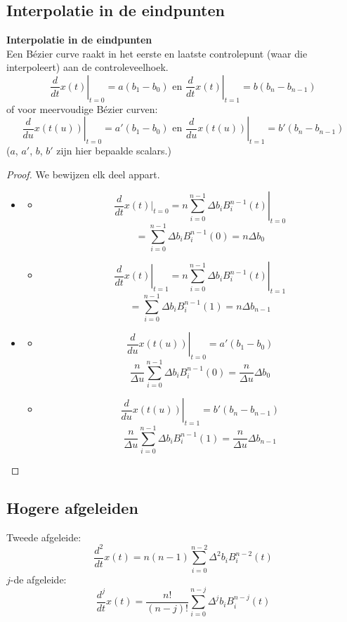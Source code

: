 \documentclass[computergesteund_ontwerp_van_curven_en_oppervlakken.tex]{subfiles}
\begin{document}
\subsection{Interpolatie in de eindpunten}
\begin{ei}\textbf{Interpolatie in de eindpunten}\\
Een B\'ezier curve raakt in het eerste en laatste controlepunt (waar die interpoleert) aan de controleveelhoek.
\[
\left.\frac{d}{dt} x(t)\right|_{t=0} = a(b_1-b_{0})
\text{ en }
\left.\frac{d}{dt}x(t)\right|_{t=1} = b(b_n-b_{n-1})
\]
\[
\]
of voor meervoudige B\'ezier curven:
\[
\left.\frac{d}{du}x(t(u))\right|_{t=0} = a'(b_1-b_{0})
\text{ en }
\left.\frac{d}{du}x(t(u))\right|_{t=1} = b'(b_n-b_{n-1})
\]
($a$, $a'$, $b$, $b'$ zijn hier bepaalde scalars.) 

\begin{proof}
We bewijzen elk deel appart.
\begin{itemize}
\item
\begin{itemize}
\item
\[
\frac{d}{dt}x(t)|_{t=0}
= \left.n\sum_{i=0}^{n-1}\Delta b_iB_{i}^{n-1}(t)\right|_{t=0}
\]
\[
= \sum_{i=0}^{n-1}\Delta b_iB_{i}^{n-1}(0)
= n\Delta b_0
\]
\item
\[
\left.\frac{d}{dt}x(t)\right|_{t=1}
= \left.n\sum_{i=0}^{n-1}\Delta b_iB_{i}^{n-1}(t)\right|_{t=1}
\]
\[
= \sum_{i=0}^{n-1}\Delta b_iB_{i}^{n-1}(1)
= n\Delta b_{n-1}
\]
\end{itemize}
\item
\begin{itemize}
\item
\[
\left.\frac{d}{du}x(t(u))\right|_{t=0} = a'(b_1-b_{0})
\]
\[
\frac{n}{\Delta u}\sum_{i=0}^{n-1}\Delta b_iB_{i}^{n-1}(0)
= \frac{n}{\Delta u}\Delta b_{0}
\]
\item
\[
\left.\frac{d}{du}x(t(u))\right|_{t=1} = b'(b_n-b_{n-1})
\]
\[
\frac{n}{\Delta u}\sum_{i=0}^{n-1}\Delta b_iB_{i}^{n-1}(1)
= \frac{n}{\Delta u}\Delta b_{n-1}
\]
\end{itemize}
\end{itemize}
\end{proof}
\end{ei}





\subsection{Hogere afgeleiden}
Tweede afgeleide:
\[
\frac{d^2}{dt}x(t) = n(n-1) \sum_{i=0}^{n-2}\Delta^2b_iB_{i}^{n-2}(t)
\]
$j$-de afgeleide:
\[
\frac{d^j}{dt}x(t) = \frac{n!}{(n-j)!}\sum_{i=0}^{n-j}\Delta^{j}b_iB_{i}^{n-j}(t)
\]
\end{document}
